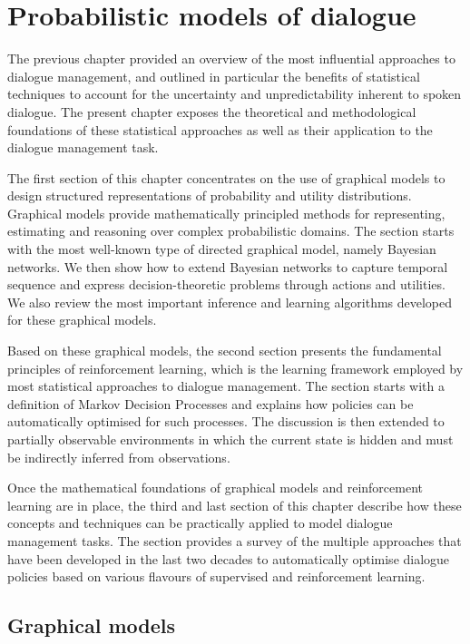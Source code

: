 \chapter{Probabilistic models of dialogue}
\label{chap:probmodelling}

The previous chapter provided an overview of the most influential approaches to dialogue management, and outlined in particular the benefits of statistical techniques to account for the uncertainty and unpredictability inherent to spoken dialogue. The present chapter exposes the theoretical and methodological foundations of these statistical approaches as well as their application to the dialogue management task. 

The first section of this chapter concentrates on the use of graphical models to design structured representations of probability and utility distributions. Graphical models provide mathematically principled methods for representing, estimating and reasoning over complex probabilistic domains. The section starts with the most well-known type of directed graphical model, namely Bayesian networks.  We then show how to extend Bayesian networks to capture temporal sequence and express decision-theoretic problems through actions and utilities. We also review the most important inference and learning algorithms developed for these graphical models.

Based on these graphical models, the second section presents the fundamental principles of reinforcement learning, which is the learning framework employed by most statistical approaches to dialogue management. The section starts with a definition of Markov Decision Processes and explains how policies can be automatically optimised for such processes.  The discussion is then extended to partially observable environments in which the current state is hidden and must be indirectly inferred from observations.   

Once the mathematical foundations of graphical models and reinforcement learning are in place, the third and last section of this chapter describe how these concepts and techniques can be practically applied to model dialogue management tasks.  The section provides a survey of the multiple approaches that have been developed in the last two decades to automatically optimise dialogue policies based on various flavours of supervised and reinforcement learning.  

\section{Graphical models}
\label{sec:pgm}

